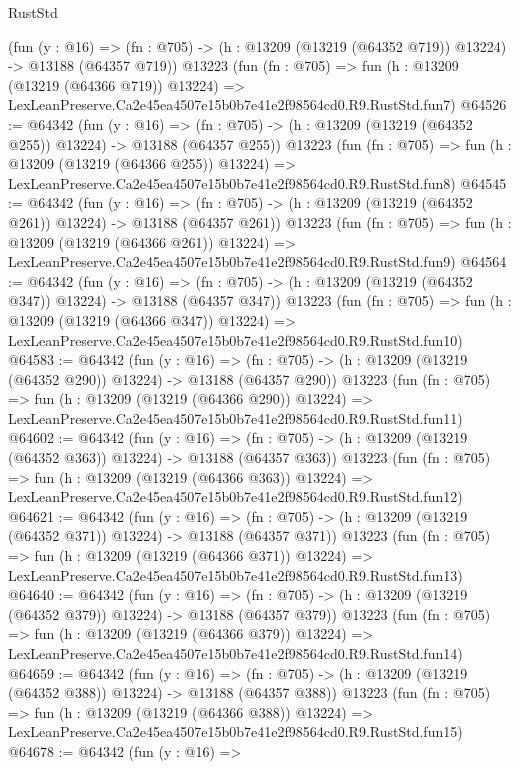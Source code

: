 \begin{lexlean}{RustStd}
\begin{coremodule}
    (fun (y : @16) =>
    (fn : @705) -> (h : @13209 (@13219 (@64352 @719)) @13224) -> @13188 (@64357 @719))
    @13223
    (fun (fn : @705) =>
    fun (h : @13209 (@13219 (@64366 @719)) @13224) =>
    LexLeanPreserve.Ca2e45ea4507e15b0b7e41e2f98564cd0.R9.RustStd.fun7)
@64526 := @64342
    (fun (y : @16) =>
    (fn : @705) -> (h : @13209 (@13219 (@64352 @255)) @13224) -> @13188 (@64357 @255))
    @13223
    (fun (fn : @705) =>
    fun (h : @13209 (@13219 (@64366 @255)) @13224) =>
    LexLeanPreserve.Ca2e45ea4507e15b0b7e41e2f98564cd0.R9.RustStd.fun8)
@64545 := @64342
    (fun (y : @16) =>
    (fn : @705) -> (h : @13209 (@13219 (@64352 @261)) @13224) -> @13188 (@64357 @261))
    @13223
    (fun (fn : @705) =>
    fun (h : @13209 (@13219 (@64366 @261)) @13224) =>
    LexLeanPreserve.Ca2e45ea4507e15b0b7e41e2f98564cd0.R9.RustStd.fun9)
@64564 := @64342
    (fun (y : @16) =>
    (fn : @705) -> (h : @13209 (@13219 (@64352 @347)) @13224) -> @13188 (@64357 @347))
    @13223
    (fun (fn : @705) =>
    fun (h : @13209 (@13219 (@64366 @347)) @13224) =>
    LexLeanPreserve.Ca2e45ea4507e15b0b7e41e2f98564cd0.R9.RustStd.fun10)
@64583 := @64342
    (fun (y : @16) =>
    (fn : @705) -> (h : @13209 (@13219 (@64352 @290)) @13224) -> @13188 (@64357 @290))
    @13223
    (fun (fn : @705) =>
    fun (h : @13209 (@13219 (@64366 @290)) @13224) =>
    LexLeanPreserve.Ca2e45ea4507e15b0b7e41e2f98564cd0.R9.RustStd.fun11)
@64602 := @64342
    (fun (y : @16) =>
    (fn : @705) -> (h : @13209 (@13219 (@64352 @363)) @13224) -> @13188 (@64357 @363))
    @13223
    (fun (fn : @705) =>
    fun (h : @13209 (@13219 (@64366 @363)) @13224) =>
    LexLeanPreserve.Ca2e45ea4507e15b0b7e41e2f98564cd0.R9.RustStd.fun12)
@64621 := @64342
    (fun (y : @16) =>
    (fn : @705) -> (h : @13209 (@13219 (@64352 @371)) @13224) -> @13188 (@64357 @371))
    @13223
    (fun (fn : @705) =>
    fun (h : @13209 (@13219 (@64366 @371)) @13224) =>
    LexLeanPreserve.Ca2e45ea4507e15b0b7e41e2f98564cd0.R9.RustStd.fun13)
@64640 := @64342
    (fun (y : @16) =>
    (fn : @705) -> (h : @13209 (@13219 (@64352 @379)) @13224) -> @13188 (@64357 @379))
    @13223
    (fun (fn : @705) =>
    fun (h : @13209 (@13219 (@64366 @379)) @13224) =>
    LexLeanPreserve.Ca2e45ea4507e15b0b7e41e2f98564cd0.R9.RustStd.fun14)
@64659 := @64342
    (fun (y : @16) =>
    (fn : @705) -> (h : @13209 (@13219 (@64352 @388)) @13224) -> @13188 (@64357 @388))
    @13223
    (fun (fn : @705) =>
    fun (h : @13209 (@13219 (@64366 @388)) @13224) =>
    LexLeanPreserve.Ca2e45ea4507e15b0b7e41e2f98564cd0.R9.RustStd.fun15)
@64678 := @64342
    (fun (y : @16) =>

\end{coremodule}
\end{lexlean}
